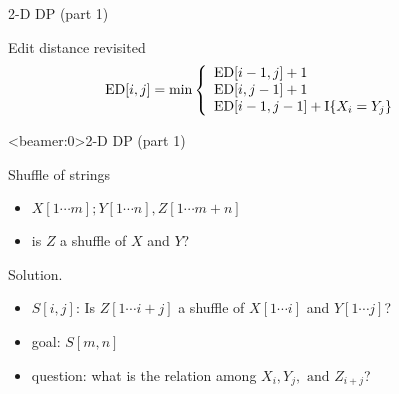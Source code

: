 \begin{frame}{2-D DP (part 1)}
  \begin{exampleblock}{Edit distance revisited}
    \begin{displaymath}
      \text{ED}[i,j] = \min \left\{ \begin{array}{ll}
	\text{ED}[i-1,j] + 1 &  \\
	\text{ED}[i,j-1] + 1 & \\
	\text{ED}[i-1,j-1] + \text{I}\{X_{i} = Y_{j}\} &
      \end{array} \right.
    \end{displaymath}
  \end{exampleblock}
    

\end{frame}
\begin{frame}<beamer:0>{2-D DP (part 1)}
  \begin{exampleblock}{Shuffle of strings }
    \begin{itemize}
      \item $X[1 \cdots m]; Y[1 \cdots n], Z[1 \cdots m+n]$
      \item is $Z$ a shuffle of $X$ and $Y$?
    \end{itemize}
  \end{exampleblock}

  \begin{block}{Solution.}
    \begin{itemize}
      \item $S[i,j]$: Is $Z[1 \cdots i+j]$ a shuffle of $X[1 \cdots i]$ and $Y[1 \cdots j]$?
      \item goal: $S[m,n]$
      \item question: what is the relation among $X_{i}, Y_{j}, \text{ and } Z_{i+j}$?
    \end{itemize}
  \end{block}
\end{frame}
